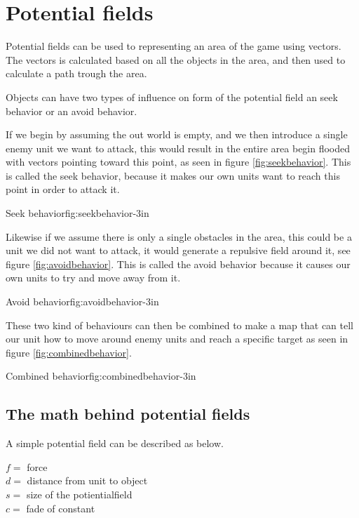 \section{Potential fields}
	Potential fields can be used to representing an area of the game using vectors.  The vectors is calculated based on all the objects in the area, and then used to calculate a path trough the area.

	Objects can have two types of influence on form of the potential field an seek behavior or an avoid behavior.
	
	If we begin by assuming the out world is empty, and we then introduce a single enemy unit we want to attack, this would result in the entire area begin flooded with vectors pointing toward this point, as seen in figure \ref{fig:seekbehavior}. This is called the seek behavior, because it makes our own units want to reach this point in order to attack it.
	
		{Seek behavior\cite{pft}}{fig:seekbehavior}{-3in}
	
	Likewise if we assume there is only a single obstacles in the area, this could be a unit we did not want to attack, it would generate a repulsive field around it, see figure \ref{fig:avoidbehavior}. This is called the avoid behavior because it causes our own units to try and move away from it.

		{Avoid behavior\cite{pft}}{fig:avoidbehavior}{-3in}
		
	These two kind of behaviours can then be combined to make a map that can tell our unit how to move around enemy units and reach a specific target as seen in figure \ref{fig:combinedbehavior}.
	
		{Combined behavior\cite{pft}}{fig:combinedbehavior}{-3in}
		
	\subsection{The math behind potential fields}
		A simple potential field can be described as below.
		
		$f =$ force\\
		$d =$ distance from unit to object\\
		$s =$ size of the potientialfield\\
		$c =$ fade of constant\\
	
